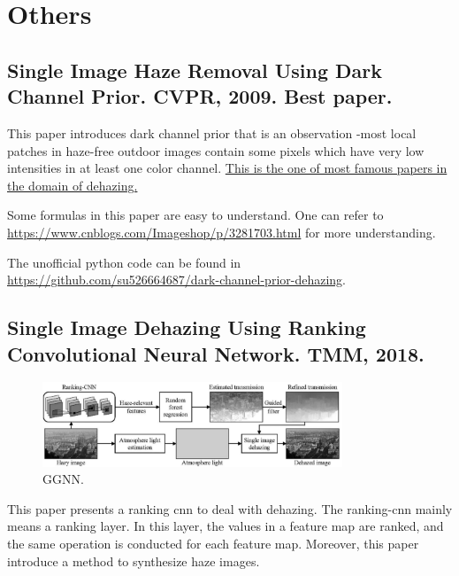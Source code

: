 \documentclass[10pt,onecolumn]{book}
\begin{document}
\chapter{Others}
\section{Single Image Haze Removal Using Dark Channel Prior. CVPR, 2009. Best paper.}
This paper introduces dark channel prior that is an observation -most local patches in haze-free outdoor images contain some pixels which have very low intensities in at least one color channel. \uline{This is the one of most famous papers in the domain of dehazing.} 

Some formulas in this paper are easy to understand. One can refer to \url{https://www.cnblogs.com/Imageshop/p/3281703.html} for more understanding. 

The unofficial python code can be found in \url{https://github.com/su526664687/dark-channel-prior-dehazing}.

\section{Single Image Dehazing Using Ranking Convolutional Neural Network. TMM, 2018.}
\begin{figure}[h]
\centering
\includegraphics[width=0.8\textwidth]{figures_paper_reading/Single_Image_Dehazing_Using_Ranking_Convolutional_Neural_Network.png}
\caption{GGNN.}
\label{fig}
\end{figure}

This paper presents a ranking cnn to deal with dehazing. The ranking-cnn mainly means a ranking layer. In this layer, the values in a feature map are ranked, and the same operation is conducted for each feature map. Moreover, this paper introduce a method to synthesize haze images.

~\cite{su2019for}

{\small


}
\end{document}
